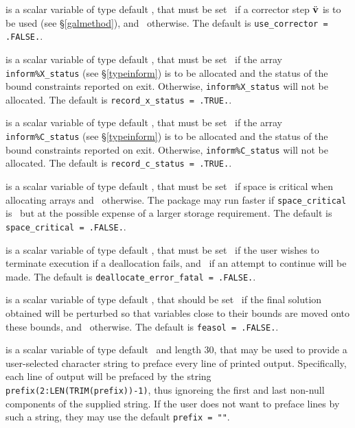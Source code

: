 \documentclass{galahad}
\begin{document}
\begin{description}
 is a scalar variable of type 
default \logical, that must be set \true\ if a corrector step $\ddot{{\mathbf{v}}}$
is to be used (see \S\ref{galmethod}), and \false\ otherwise. 
The default is {\tt use\_corrector = .FALSE.}.

 is a scalar variable of type 
default \logical, that must be set \true\ if the array 
{\tt inform\%X\_status} (see \S\ref{typeinform})
is to be allocated and the status of the bound 
constraints reported on exit. Otherwise, {\tt inform\%X\_status} will
not be allocated. The default is {\tt record\_x\_status = .TRUE.}.

 is a scalar variable of type 
default \logical, that must be set \true\ if the array 
{\tt inform\%C\_status} (see \S\ref{typeinform})
is to be allocated and the status of the bound 
constraints reported on exit. Otherwise, {\tt inform\%C\_status} will
not be allocated. The default is {\tt record\_c\_status = .TRUE.}.

 is a scalar variable of type default \logical, 
that must be set \true\ if space is critical when allocating arrays
and  \false\ otherwise. The package may run faster if 
{\tt space\_critical} is \false\ but at the possible expense of a larger
storage requirement. The default is {\tt space\_critical = .FALSE.}.

 is a scalar variable of type default \logical, 
that must be set \true\ if the user wishes to terminate execution if
a deallocation  fails, and \false\ if an attempt to continue
will be made. The default is {\tt deallocate\_error\_fatal = .FALSE.}.

 is a scalar variable of type default \logical, that 
should be set \true\ 
if the final solution obtained will be perturbed 
so that variables close to their bounds are moved onto these bounds,
and \false\ otherwise. 
The default is {\tt feasol = .FALSE.}.

 is a scalar variable of type default \character\
and length 30, that may be used to provide a user-selected 
character string to preface every line of printed output. 
Specifically, each line of output will be prefaced by the string 
{\tt prefix(2:LEN(TRIM(prefix))-1)},
thus ignoreing the first and last non-null components of the
supplied string. If the user does not want to preface lines by such
a string, they may use the default {\tt prefix = ""}.


\end{description}
\end{document}
